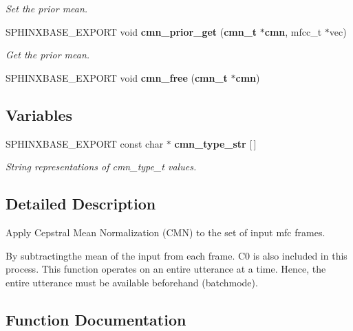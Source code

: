 \begin{DoxyCompactItemize}
\begin{DoxyCompactList}\small\item\em Set the prior mean. \end{DoxyCompactList}\item 
S\+P\+H\+I\+N\+X\+B\+A\+S\+E\+\_\+\+E\+X\+P\+O\+R\+T void {\bf cmn\+\_\+prior\+\_\+get} ({\bf cmn\+\_\+t} $\ast${\bf cmn}, mfcc\+\_\+t $\ast$vec)\label{cmn_8h_a4f624f5b805288f66fa05b79b1e4f383}

\begin{DoxyCompactList}\small\item\em Get the prior mean. \end{DoxyCompactList}\item 
S\+P\+H\+I\+N\+X\+B\+A\+S\+E\+\_\+\+E\+X\+P\+O\+R\+T void {\bfseries cmn\+\_\+free} ({\bf cmn\+\_\+t} $\ast${\bf cmn})\label{cmn_8h_a0f70f378107e3d4e861e39d4f76d8d50}

\end{DoxyCompactItemize}
\subsection*{Variables}
\begin{DoxyCompactItemize}
\item 
S\+P\+H\+I\+N\+X\+B\+A\+S\+E\+\_\+\+E\+X\+P\+O\+R\+T const char $\ast$ {\bf cmn\+\_\+type\+\_\+str} [$\,$]
\begin{DoxyCompactList}\small\item\em String representations of cmn\+\_\+type\+\_\+t values. \end{DoxyCompactList}\end{DoxyCompactItemize}


\subsection{Detailed Description}
Apply Cepstral Mean Normalization (C\+M\+N) to the set of input mfc frames. 

By subtractingthe mean of the input from each frame. C0 is also included in this process. This function operates on an entire utterance at a time. Hence, the entire utterance must be available beforehand (batchmode). 

\subsection{Function Documentation}
